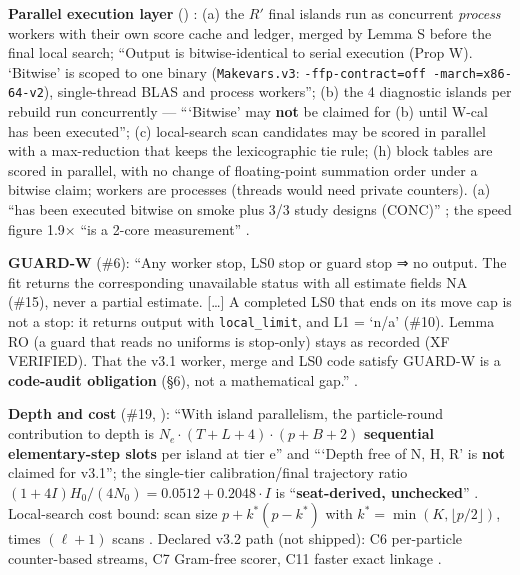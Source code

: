 \textbf{Parallel execution layer} () :
(a) the $R'$ final islands run as concurrent \emph{process} workers with their own score cache and ledger, merged by
Lemma S before the final local search; ``Output is bitwise-identical to serial execution (Prop W). `Bitwise' is scoped to
one binary (\texttt{Makevars.v3}: \texttt{-ffp-contract=off -march=x86-64-v2}), single-thread BLAS and process workers'';
(b) the 4 diagnostic islands per rebuild run concurrently --- ```Bitwise' may \textbf{not} be claimed for (b) until W-cal
has been executed''; (c) local-search scan candidates may be scored in parallel with a max-reduction that keeps the
lexicographic tie rule; (h) block tables are scored in parallel, with no change of floating-point summation order under a
bitwise claim; workers are processes (threads would need private counters). (a) ``has been executed bitwise on smoke plus
3/3 study designs (CONC)'' ; the speed figure 1.9$\times$ ``is a 2-core
measurement'' .

\textbf{GUARD-W} (\#6): ``Any worker stop, LS0 stop or guard stop ⇒ no output. The fit returns the corresponding unavailable
status with all estimate fields NA (\#15), never a partial estimate. [\dots] A completed LS0 that ends on its move cap is not
a stop: it returns output with \texttt{local\_limit}, and L1 = `n/a' (\#10). Lemma RO (a guard that reads no uniforms is
stop-only) stays as recorded (XF VERIFIED). That the v3.1 worker, merge and LS0 code satisfy GUARD-W is a
\textbf{code-audit obligation} (\S6), not a mathematical gap.'' .

\textbf{Depth and cost} (\#19, ): ``With island parallelism, the particle-round contribution to depth is
$N_e\cdot(T+L+4)\cdot(p+B+2)$ \textbf{sequential elementary-step slots} per island at tier e'' and ```Depth free of N, H, R'
is \textbf{not} claimed for v3.1''; the single-tier calibration/final trajectory ratio $(1+4I)H_0/(4N_0)=0.0512+0.2048\cdot I$ is
``\textbf{seat-derived, unchecked}'' . Local-search cost bound:
scan size $p+k^*(p-k^*)$ with $k^*=\min(K,\lfloor p/2\rfloor)$, times $(\ell+1)$ scans
. Declared v3.2 path (not shipped): C6 per-particle counter-based
streams, C7 Gram-free scorer, C11 faster exact linkage .


